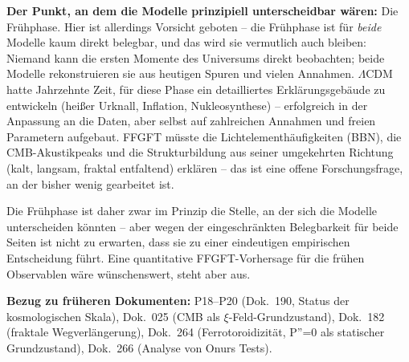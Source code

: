 \textbf{Der Punkt, an dem die Modelle prinzipiell unterscheidbar wären:}
Die Frühphase. Hier ist allerdings Vorsicht geboten -- die Frühphase ist
für \emph{beide} Modelle kaum direkt belegbar, und das wird sie vermutlich
auch bleiben: Niemand kann die ersten Momente des Universums direkt
beobachten; beide Modelle rekonstruieren sie aus heutigen Spuren und vielen
Annahmen. $\Lambda$CDM hatte Jahrzehnte Zeit, für diese Phase ein
detailliertes Erklärungsgebäude zu entwickeln (heißer Urknall, Inflation,
Nukleosynthese) -- erfolgreich in der Anpassung an die Daten, aber selbst
auf zahlreichen Annahmen und freien Parametern aufgebaut. FFGFT müsste die
Lichtelementhäufigkeiten (BBN), die CMB-Akustikpeaks und die Strukturbildung
aus seiner umgekehrten Richtung (kalt, langsam, fraktal entfaltend) erklären
-- das ist eine offene Forschungsfrage, an der bisher wenig gearbeitet ist.

Die Frühphase ist daher zwar im Prinzip die Stelle, an der sich die Modelle
unterscheiden könnten -- aber wegen der eingeschränkten Belegbarkeit für
beide Seiten ist nicht zu erwarten, dass sie zu einer eindeutigen
empirischen Entscheidung führt. Eine quantitative FFGFT-Vorhersage für die
frühen Observablen wäre wünschenswert, steht aber aus.

\noindent\textbf{Bezug zu früheren Dokumenten:} P18--P20 (Dok.~190, Status
der kosmologischen Skala), Dok.~025 (CMB als $\xi$-Feld-Grundzustand),
Dok.~182 (fraktale Wegverlängerung), Dok.~264 (Ferrotoroidizität, P''=0
als statischer Grundzustand), Dok.~266 (Analyse von Onurs Tests).
